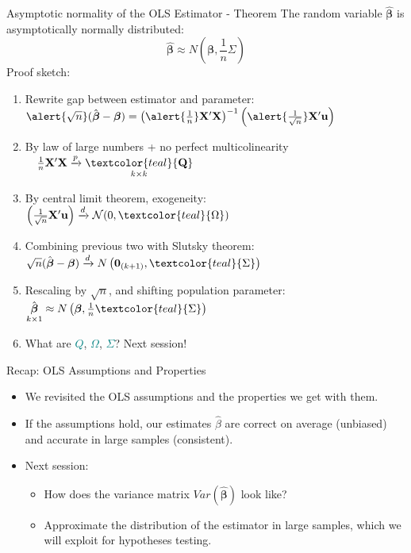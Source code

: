 \documentclass[11pt, aspectratio = 169]{beamer}
\begin{document}
\begin{frame}{Asymptotic normality of the OLS Estimator - Theorem}
The random variable $\hat{\boldsymbol{\beta}}$ is asymptotically normally distributed:
$$
\hat{\boldsymbol{\beta}} \approx N\left(\boldsymbol{\beta}, \frac{1}{n} \Sigma\right)
$$
\pause
Proof sketch:
\begin{enumerate}  
    \item Rewrite gap between estimator and parameter:
    $\alert{\sqrt{n}}(\hat{\boldsymbol{\beta}}-\boldsymbol{\beta}) = 
    \left(\alert{\frac{1}{n}}\mathbf{X}'\mathbf{X}\right)^{-1}\left(\alert{\frac{1}{\sqrt{n}}}\mathbf{X}'\mathbf{u}\right)$
    \pause
    \item By law of large numbers + no perfect multicolinearity 
    $\quad \frac{1}{n}\mathbf{X}'\mathbf{X} \xrightarrow{p} \underset{k \times k}{\textcolor{teal}{\mathbf{Q}}}$
    \item By central limit theorem, exogeneity: $
\left(\tfrac{1}{\sqrt{n}}\mathbf{X}'\mathbf{u}\right)
\xrightarrow{d}
\mathcal{N}\!\left(0, \textcolor{teal}{\Omega} \right)
$
    \pause
    \item Combining previous two with Slutsky theorem:
    $
    \sqrt{n}(\hat{\boldsymbol{\beta}} - \boldsymbol{\beta}) \xrightarrow[]{d} N\left(\mathbf{0}_{(k+1)}, \textcolor{teal}{\Sigma}\right)
    $
    \item Rescaling by $\sqrt{n}$, and shifting population parameter: 
    $
    \underset{k \times 1}{\hat{\boldsymbol{\beta}}}
     \approx N \left(\boldsymbol{\beta}, \frac{1}{n} \textcolor{teal}{\Sigma} \right)
    $
    \pause
    \item[$\rightarrow$] What are \textcolor{teal}{$Q$}, \textcolor{teal}{$\Omega$}, \textcolor{teal}{$\Sigma$}? \pause Next session!
\end{enumerate}

\end{frame}

\begin{frame}{Recap: OLS Assumptions and Properties}

\begin{itemize}
    \item We revisited the OLS assumptions and the properties we get with them.
\item If the assumptions hold, our estimates $\hat{\beta}$ are correct on average (unbiased) and accurate in large samples (consistent).
\pause
\item Next session:
\begin{itemize}
    \item How does the variance matrix $Var(\hat{\boldsymbol{\beta}})$ look like?
    \item Approximate the distribution of the estimator in large samples, which we will exploit for  hypotheses testing.
\end{itemize}
\end{itemize}
\end{frame}
\end{document}
